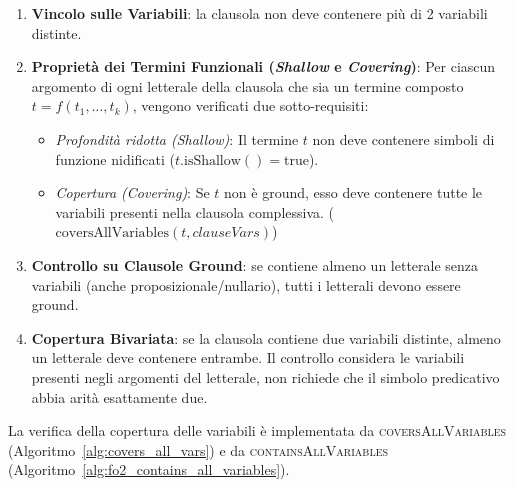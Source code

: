 \begin{enumerate}
    \item \textbf{Vincolo sulle Variabili}: la clausola non deve contenere più di 2 variabili distinte.
    
    \item \textbf{Proprietà dei Termini Funzionali (\textit{Shallow} e \textit{Covering})}: Per ciascun argomento di ogni letterale della clausola che sia un termine composto $t = f(t_1, \dots, t_k)$, vengono verificati due sotto-requisiti:
    \begin{itemize}
        \item \textit{Profondità ridotta (Shallow)}: Il termine $t$ non deve contenere simboli di funzione nidificati ($t.\text{isShallow}() = \text{true}$).
        \item \textit{Copertura (Covering)}: Se $t$ non è ground, esso deve contenere tutte le variabili presenti nella clausola complessiva. ($\text{coversAllVariables}(t, clauseVars)$)
    \end{itemize}
    \item \textbf{Controllo su Clausole Ground}: se contiene almeno un letterale senza variabili (anche proposizionale/nullario), tutti i letterali devono essere ground.

    \item \textbf{Copertura Bivariata}: se la clausola contiene due variabili distinte, almeno un letterale deve contenere entrambe. Il controllo considera le variabili presenti negli argomenti del letterale, non richiede che il simbolo predicativo abbia arità esattamente due.
\end{enumerate}

La verifica della copertura delle variabili è implementata da \textsc{coversAllVariables} (Algoritmo~\ref{alg:covers_all_vars}) e da \textsc{containsAllVariables} (Algoritmo~\ref{alg:fo2_contains_all_variables}).

